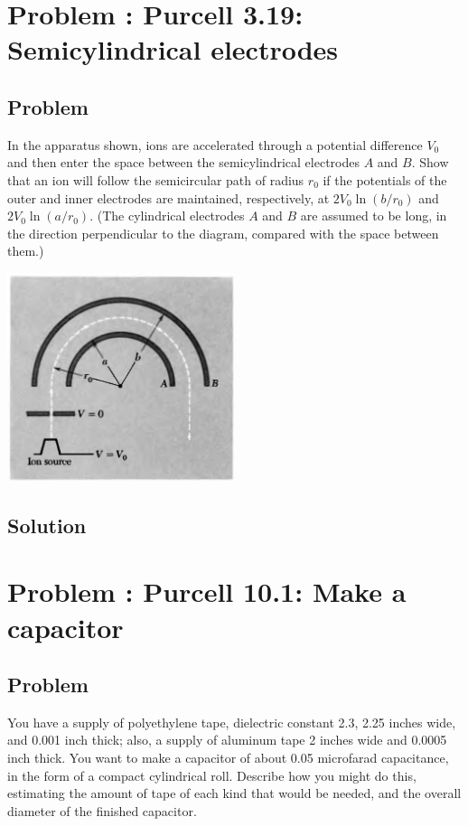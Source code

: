 \documentclass[solutions]{esg8022pset}
\begin{document}
\section{Problem \thesection: Purcell 3.19: Semicylindrical electrodes}
\subsection{Problem}
  In the apparatus shown, ions are accelerated through a potential difference $V_0$ and then enter the space between the semicylindrical electrodes $A$ and $B$. Show that an ion will follow the semicircular path of radius $r_0$ if the potentials of the outer and inner electrodes are maintained, respectively, at $2V_0\ln(b/r_0)$ and $2V_0\ln(a/r_0)$. (The cylindrical electrodes $A$ and $B$ are assumed to be long, in the direction perpendicular to the diagram, compared with the space between them.)
  \begin{center}\includegraphics[width=0.5\textwidth]{ps04_06}\end{center}
\subsection{Solution}

\section{Problem \thesection: Purcell 10.1: Make a capacitor}
\subsection{Problem}
  You have a supply of polyethylene tape, dielectric constant
  2.3, 2.25 inches wide, and 0.001 inch thick; also, a supply of aluminum
  tape 2 inches wide and 0.0005 inch thick. You want to make a capacitor
  of about 0.05 microfarad capacitance, in the form of a compact
  cylindrical roll. Describe how you might do this, estimating the
  amount of tape of each kind that would be needed, and the overall
  diameter of the finished capacitor.
\end{document}
